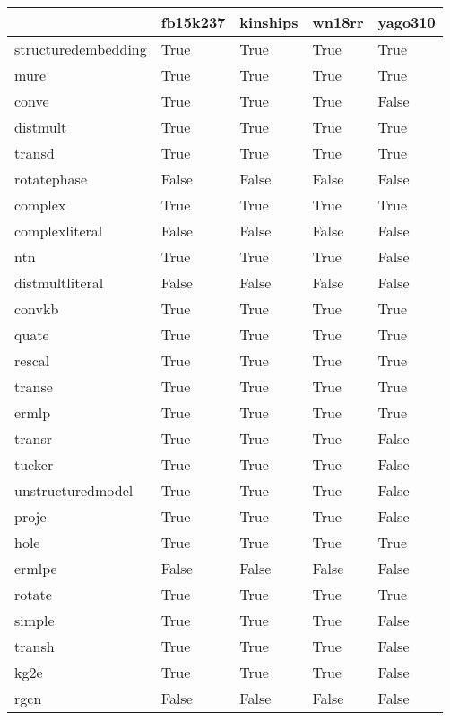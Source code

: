 \begin{tabular}{lllll}
\toprule
{} &  fb15k237 &  kinships &  wn18rr &  yago310 \\
\midrule
structuredembedding &      True &      True &    True &     True \\
mure                &      True &      True &    True &     True \\
conve               &      True &      True &    True &    False \\
distmult            &      True &      True &    True &     True \\
transd              &      True &      True &    True &     True \\
rotatephase         &     False &     False &   False &    False \\
complex             &      True &      True &    True &     True \\
complexliteral      &     False &     False &   False &    False \\
ntn                 &      True &      True &    True &    False \\
distmultliteral     &     False &     False &   False &    False \\
convkb              &      True &      True &    True &     True \\
quate               &      True &      True &    True &     True \\
rescal              &      True &      True &    True &     True \\
transe              &      True &      True &    True &     True \\
ermlp               &      True &      True &    True &     True \\
transr              &      True &      True &    True &    False \\
tucker              &      True &      True &    True &    False \\
unstructuredmodel   &      True &      True &    True &    False \\
proje               &      True &      True &    True &    False \\
hole                &      True &      True &    True &     True \\
ermlpe              &     False &     False &   False &    False \\
rotate              &      True &      True &    True &     True \\
simple              &      True &      True &    True &    False \\
transh              &      True &      True &    True &    False \\
kg2e                &      True &      True &    True &    False \\
rgcn                &     False &     False &   False &    False \\
\bottomrule
\end{tabular}
